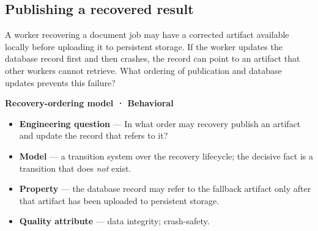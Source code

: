 \subsection{Publishing a recovered result}\label{heading:publishing-a-recovered-result}

A worker recovering a document job may have a corrected artifact available locally before uploading it to persistent storage. If the worker updates the database record first and then crashes, the record can point to an artifact that other workers cannot retrieve. What ordering of publication and database updates prevents this failure?

\textbf{Recovery-ordering model · Behavioral}

\begin{itemize}
\tightlist
\item
  \textbf{Engineering question} --- In what order may recovery publish an artifact and update the record that refers to it?
\end{itemize}

\begin{itemize}
\tightlist
\item
  \textbf{Model} --- a transition system over the recovery lifecycle; the decisive fact is a transition that does \emph{not} exist.
\end{itemize}

\begin{itemize}
\tightlist
\item
  \textbf{Property} --- the database record may refer to the fallback artifact only after that artifact has been uploaded to persistent storage.
\end{itemize}

\begin{itemize}
\tightlist
\item
  \textbf{Quality attribute} --- data integrity; crash-safety.
\end{itemize}



